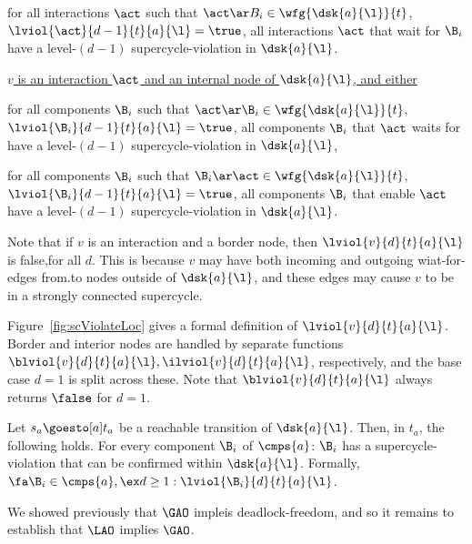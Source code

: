 {   \item for all interactions $\act$ such that $\act \ar B_i \in \wfg{\dsk{a}{\l}}{t}$, $\lviol{\act}{d-1}{t}{a}{\l} = \true$,
         \ie all interactions $\act$ that wait for $\B_i$ have a level-$(d-1)$ supercycle-violation in $\dsk{a}{\l}$.

   \ee


\item \ul{$v$ is an interaction $\act$ and an internal node of $\dsk{a}{\l}$, and either}
   \be

   \item for all components $\B_i$ such that $\act \ar \B_i \in \wfg{\dsk{a}{\l}}{t}$, $\lviol{\B_i}{d-1}{t}{a}{\l} = \true$,
         \ie all components $\B_i$ that $\act$ waits for have a level-$(d-1)$ supercycle-violation in $\dsk{a}{\l}$,

   \item for all components $\B_i$ such that $\B_i \ar \act \in \wfg{\dsk{a}{\l}}{t}$, $\lviol{\B_i}{d-1}{t}{a}{\l} = \true$,
         \ie all  components $\B_i$ that enable $\act$ have a level-$(d-1)$ supercycle-violation in $\dsk{a}{\l}$.

   \ee

\ee
Note that if $v$ is an interaction and a border node, then $\lviol{v}{d}{t}{a}{\l}$ is false,for all $d$.   This is
because $v$ may have both incoming and outgoing wiat-for-edges from.to nodes outside of $\dsk{a}{\l}$, and these edges
may cause $v$ to be in a strongly connected supercycle.

Figure~\ref{fig:scViolateLoc} gives a formal definition of $\lviol{v}{d}{t}{a}{\l}$. Border and interior nodes are
handled by separate functions $\blviol{v}{d}{t}{a}{\l}, \ilviol{v}{d}{t}{a}{\l}$, respectively, and the base case $d=1$
is split across these. Note that $\blviol{v}{d}{t}{a}{\l}$ always returns $\false$ for $d=1$.

}



\bd[$\LAO(a, \l)$] \label{def:lao}
Let $s_a \goesto[a] t_a$ be a reachable transition of $\dsk{a}{\l}$.
Then, in $t_a$, the following holds. 
For every component $\B_i$ of $\cmps{a}$:  
$\B_i$ has a supercycle-violation that can be confirmed within $\dsk{a}{\l}$.
Formally,\\
\ind  $\fa \B_i \in \cmps{a}, \ex d \ge 1: \lviol{\B_i}{d}{t}{a}{\l}$.
\ed

We showed previously that $\GAO$ impleis deadlock-freedom, and so it remains to establish that $\LAO$ implies $\GAO$. 


